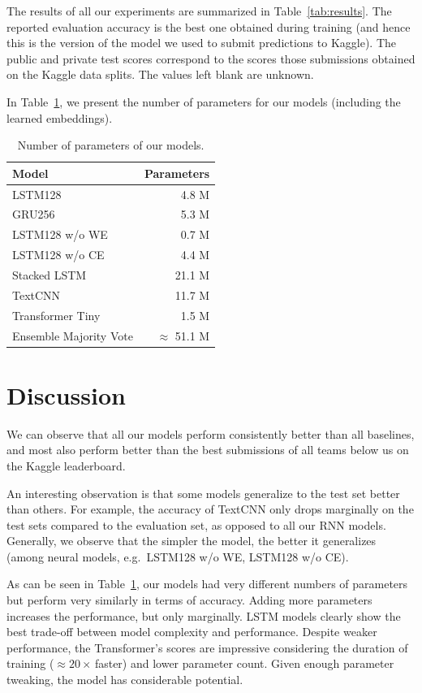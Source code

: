 \documentclass[10pt,conference,compsocconf]{IEEEtran}
\begin{document}
The results of all our experiments are summarized in Table~\ref{tab:results}. The reported evaluation accuracy is the best one obtained during training (and hence this is the version of the model we used to submit predictions to Kaggle). The public and private test scores correspond to the scores those submissions obtained on the Kaggle data splits. The values left blank are unknown.

In Table~\ref{tab:params}, we present the number of parameters for our models (including the learned embeddings).

\begin{table}\centering
\begin{tabular}{lr}
\toprule
Model & Parameters\\
\midrule
LSTM128 & 4.8 M\\
GRU256 & 5.3 M\\
LSTM128 w/o WE & 0.7 M\\
LSTM128 w/o CE & 4.4 M\\
Stacked LSTM & 21.1 M\\
TextCNN & 11.7 M\\
Transformer Tiny & 1.5 M\\
Ensemble Majority Vote & $\approx$ 51.1 M\\
\bottomrule
\end{tabular}
\caption{Number of parameters of our models.}\label{tab:params}
\end{table}

\section{Discussion}

We can observe that all our models perform consistently better than all baselines, and most also perform better than the best submissions of all teams below us on the Kaggle leaderboard.

An interesting observation is that some models generalize to the test set better than others. For example, the accuracy of TextCNN only drops marginally on the test sets compared to the evaluation set, as opposed to all our RNN models. Generally, we observe that the simpler the model, the better it generalizes (among neural models, e.g.~LSTM128 w/o WE, LSTM128 w/o CE).

As can be seen in Table~\ref{tab:params}, our models had very different numbers of parameters but perform very similarly in terms of accuracy. Adding more parameters increases the performance, but only marginally. LSTM models clearly show the best trade-off between model complexity and performance. Despite weaker performance, the Transformer's scores are impressive considering the duration of training ($\approx 20\times$\,faster) and lower parameter count. Given enough parameter tweaking, the model has considerable potential.
\end{document}
